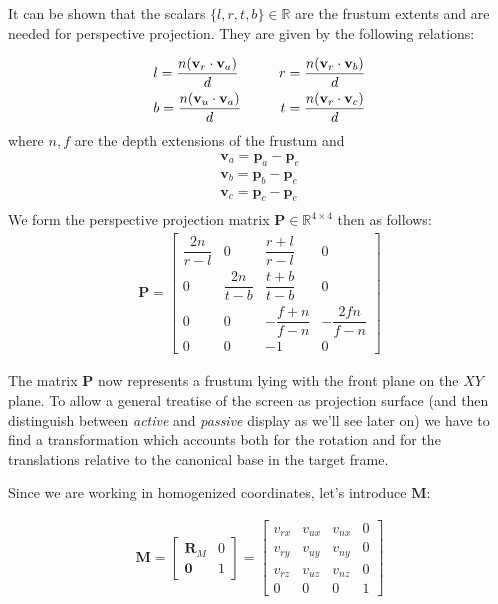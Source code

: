 \documentclass[acmtocl,acmnow]{acmtrans2m}
\begin{document}
It can be shown that the scalars $\{l,r,t,b\} \in \mathbb{R}$ are the frustum extents and are needed for perspective projection. They are given by the following relations:

\begin{eqnarray*}
& l = \dfrac{n(\mathbf{v}_r \cdot \mathbf{v}_a )}{d} &\hspace{6mm} r = \dfrac{n(\mathbf{v}_r
\cdot \mathbf{v}_b )}{d} \nonumber \\
& b = \dfrac{n(\mathbf{v}_u \cdot \mathbf{v}_a )}{d} &\hspace{6mm} t = \dfrac{n(\mathbf{v}_r
\cdot \mathbf{v}_c )}{d} 
\end{eqnarray*}
where $n,f$ are the depth extensions of the frustum and 
\begin{eqnarray*}
\mathbf{v}_a  = \mathbf{p}_a - \mathbf{p}_e \nonumber \\ 
\mathbf{v}_b  = \mathbf{p}_b - \mathbf{p}_e \nonumber \\
\mathbf{v}_c  = \mathbf{p}_c - \mathbf{p}_e \nonumber \\
\end{eqnarray*}
We form the perspective projection matrix $\mathbf{P}\in \mathbb{R}^{4 \times 4}$ then as
follows:
\begin{align}
\mathbf{P}= \begin{bmatrix}
\dfrac{2n}{r-l} & 0 & \dfrac{r+l}{r-l} & 0 \\ 
0 & \dfrac{2n}{t-b} & \dfrac{t+b}{t-b} & 0 \\ 
0 & 0 & -\dfrac{f+n}{f-n} & -\dfrac{2fn}{f-n} \\ 
0 & 0 & -1 & 0 
\end{bmatrix}
\end{align}

The matrix $\mathbf{P}$ now represents a frustum lying with the front plane on the $XY$ plane.
To allow a general treatise of the screen as projection surface (and then distinguish between \emph{active} and \emph{passive} display as we'll see later on) we have to find a transformation which accounts both for the rotation and for 
the translations relative to the canonical base in the target frame.

Since we are working in homogenized coordinates, let's introduce $\mathbf{M}$:

\begin{align*}
\mathbf{M} =
\begin{bmatrix}
\mathbf{R}_M & 0 \\
\mathbf{0} & 1 
\end{bmatrix}
=
\begin{bmatrix}
v_{rx} & v_{ux} & v_{nx} & 0 \\
v_{ry} & v_{uy} & v_{ny} & 0 \\
v_{rz} & v_{uz} & v_{nz} & 0 \\
0 & 0 & 0 & 1
\end{bmatrix}
\end{align*}
\end{document}
